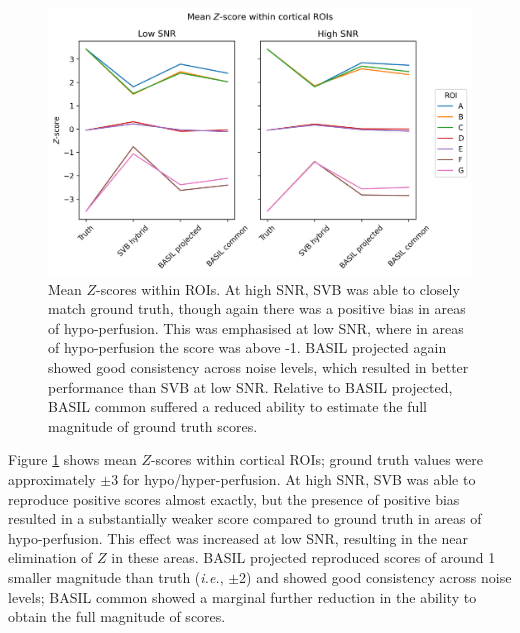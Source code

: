 \documentclass[12pt]{report}
\begin{document}
\begin{figure}[H]
\centering
\includegraphics[width=\textwidth]{roi_zscores.png}
\caption{Mean $Z$-scores within ROIs. At high SNR, SVB was able to closely match ground truth, though again there was a positive bias in areas of hypo-perfusion. This was emphasised at low SNR, where in areas of hypo-perfusion the score was above -1. BASIL projected again showed good consistency across noise levels, which resulted in better performance than SVB at low SNR. Relative to BASIL projected, BASIL common suffered a reduced ability to estimate the full magnitude of ground truth scores.}
\label{roi_zscores} 
\end{figure}

Figure \ref{roi_zscores} shows mean $Z$-scores within cortical ROIs; ground truth values were approximately $\pm$3 for hypo/hyper-perfusion. At high SNR, SVB was able to reproduce positive scores almost exactly, but the presence of positive bias resulted in a substantially weaker score compared to ground truth in areas of hypo-perfusion. This effect was increased at low SNR, resulting in the near elimination of $Z$ in these areas. BASIL projected reproduced scores of around 1 smaller magnitude than truth (\textit{i.e.}, $\pm$2) and showed good consistency across noise levels; BASIL common showed a marginal further reduction in the ability to obtain the full magnitude of scores. 
\end{document}
